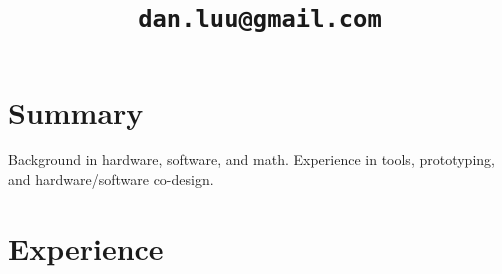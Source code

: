\documentclass[letterpaper]{scrartcl}
\begin{document}
\title{\vspace{-6ex}\tt{dan.luu@gmail.com}}
\date{\vspace{-10ex}}
\author{}

%
%



%
%

\section*{Summary}
\begin{list1}
  \item Background in hardware, software, and math. Experience in tools, prototyping, and hardware/software co-design.

\end{list1}

\section*{Experience}
\end{document}
